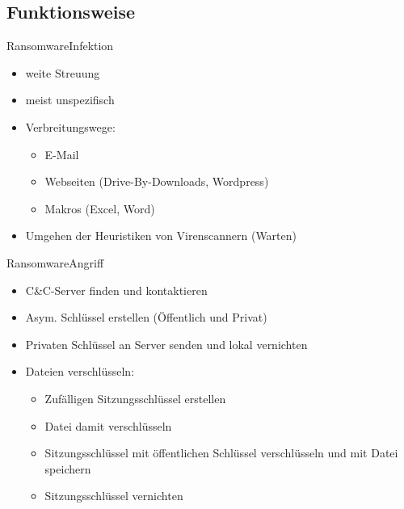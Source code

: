 \documentclass[10pt]{beamer}
\begin{document}
\subsection{Funktionsweise}
\begin{frame}{Ransomware}{Infektion}
		\begin{itemize}
			\item weite Streuung
			\item meist unspezifisch
			\item Verbreitungswege:
				\begin{itemize}
					\item E-Mail
					\item Webseiten (Drive-By-Downloads, Wordpress)
					\item Makros (Excel, Word)
				\end{itemize}
			\item Umgehen der Heuristiken von Virenscannern (Warten)
		\end{itemize}
\end{frame}
\begin{frame}{Ransomware}{Angriff}
		\begin{itemize}
			\item C\&C-Server finden und kontaktieren
			\item Asym. Schlüssel erstellen (Öffentlich und Privat)
			\item Privaten Schlüssel an Server senden und lokal vernichten
			\item Dateien verschlüsseln:
				\begin{itemize}
					\item Zufälligen Sitzungsschlüssel erstellen
					\item Datei damit verschlüsseln
					\item Sitzungsschlüssel mit öffentlichen Schlüssel verschlüsseln und mit Datei speichern
					\item Sitzungsschlüssel vernichten
				\end{itemize}
		\end{itemize}
\end{frame}
\end{document}
